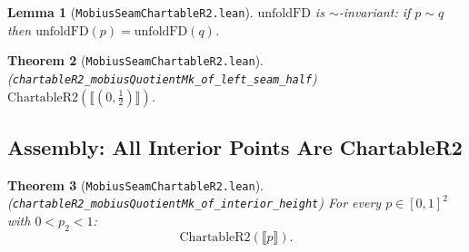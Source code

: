 \documentclass[11pt]{article}
\newtheorem{theorem}{Theorem}[section]
\newtheorem{lemma}[theorem]{Lemma}
\newcommand{\leanref}[1]{\texttt{\small #1}}
\begin{document}
\begin{lemma}[\leanref{MobiusSeamChartableR2.lean}]
$\mathrm{unfoldFD}$ is $\sim$-invariant: if $p \sim q$ then $\mathrm{unfoldFD}(p) = \mathrm{unfoldFD}(q)$.
\end{lemma}


\begin{theorem}[\leanref{MobiusSeamChartableR2.lean}]
\label{thm:equator}
(\leanref{chartableR2\_mobiusQuotientMk\_of\_left\_seam\_half})
$\mathrm{ChartableR2}(\llbracket (0, \tfrac{1}{2}) \rrbracket)$.
\end{theorem}

%

\subsection{Assembly: All Interior Points Are ChartableR2}

\begin{theorem}[\leanref{MobiusSeamChartableR2.lean}]
\label{thm:interior-height}
(\leanref{chartableR2\_mobiusQuotientMk\_of\_interior\_height})
For every $p \in [0,1]^2$ with $0 < p_2 < 1$:
\[
  \mathrm{ChartableR2}(\llbracket p \rrbracket).
\]
\end{theorem}

\end{document}
